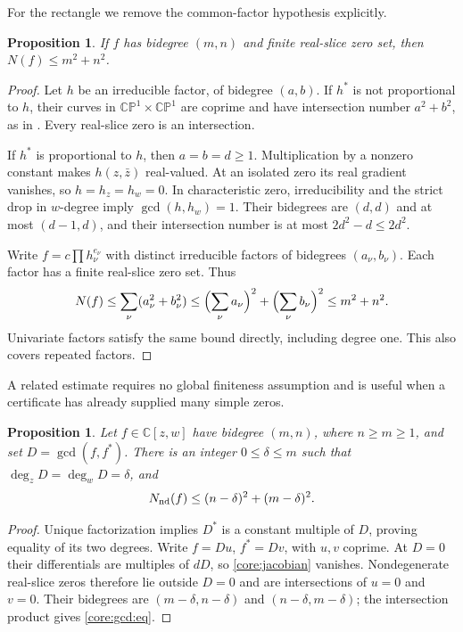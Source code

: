 \documentclass[UTF8,11pt]{ctexart}
\newtheorem{prop}[thm]{Proposition}
\theoremstyle{definition}
\numberwithin{equation}{section}
\newcommand{\C}{\mathbb C}\newcommand{\R}{\mathbb R}
\newcommand{\CP}{\mathbb {CP}}\newcommand{\cP}{\mathcal P}
\begin{document}
For the rectangle we remove the common-factor hypothesis explicitly.
\begin{prop}\label{b:prop:bezout}\label{d:lem:rectangle}
If $f$ has bidegree $(m,n)$ and finite real-slice zero set, then $N(f)\le m^2+n^2$.
\end{prop}
\begin{proof}
Let $h$ be an irreducible factor, of bidegree $(a,b)$. If $h^*$ is not proportional to $h$, their curves in $\CP^1\times\CP^1$ are coprime and have intersection number $a^2+b^2$, as in \cite[Proposition~1.10, \av, p.~4]{KLP24}. Every real-slice zero is an intersection.

If $h^*$ is proportional to $h$, then $a=b=d\ge1$. Multiplication by a nonzero constant makes $h(z,\bar z)$ real-valued. At an isolated zero its real gradient vanishes, so $h=h_z=h_w=0$. In characteristic zero, irreducibility and the strict drop in $w$-degree imply $\gcd(h,h_w)=1$. Their bidegrees are $(d,d)$ and at most $(d-1,d)$, and their intersection number is at most $2d^2-d\le2d^2$.

Write $f=c\prod h_\nu^{e_\nu}$ with distinct irreducible factors of bidegrees $(a_\nu,b_\nu)$. Each factor has a finite real-slice zero set. Thus
\[
 N(f)\le\sum_\nu(a_\nu^2+b_\nu^2)
 \le\Bigl(\sum_\nu a_\nu\Bigr)^2+\Bigl(\sum_\nu b_\nu\Bigr)^2
 \le m^2+n^2.
\]
Univariate factors satisfy the same bound directly, including degree one. This also covers repeated factors.
\end{proof}

A related estimate requires no global finiteness assumption and is useful when a certificate has already supplied many simple zeros.
\begin{prop}\label{core:gcd}
Let $f\in\C[z,w]$ have bidegree $(m,n)$, where $n\ge m\ge1$, and set $D=\gcd(f,f^*)$. There is an integer $0\le\delta\le m$ such that $\deg_zD=\deg_wD=\delta$, and
\begin{equation}\label{core:gcd:eq}
 N_{\rm nd}(f)\le(n-\delta)^2+(m-\delta)^2.
\end{equation}
\end{prop}
\begin{proof}
Unique factorization implies $D^*$ is a constant multiple of $D$, proving equality of its two degrees. Write $f=Du$, $f^*=Dv$, with $u,v$ coprime. At $D=0$ their differentials are multiples of $dD$, so \eqref{core:jacobian} vanishes. Nondegenerate real-slice zeros therefore lie outside $D=0$ and are intersections of $u=0$ and $v=0$. Their bidegrees are $(m-\delta,n-\delta)$ and $(n-\delta,m-\delta)$; the intersection product gives \eqref{core:gcd:eq}.
\end{proof}
\end{document}
